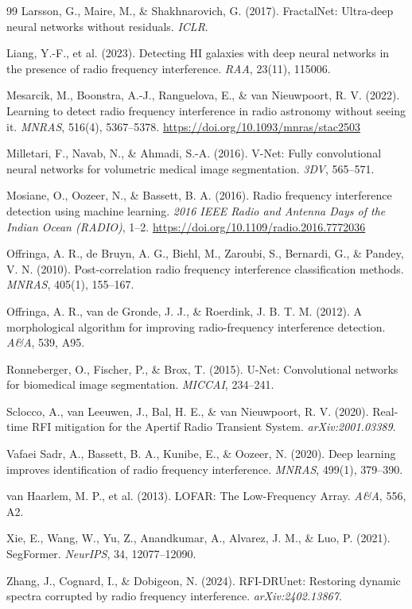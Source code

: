 \documentclass[11pt]{article}
\begin{document}
\begin{thebibliography}{99}
 Larsson, G., Maire, M., \& Shakhnarovich, G. (2017). FractalNet: Ultra-deep neural networks without residuals. \emph{ICLR}.

 Liang, Y.-F., et al. (2023). Detecting HI galaxies with deep neural networks in the presence of radio frequency interference. \emph{RAA}, 23(11), 115006.

 Mesarcik, M., Boonstra, A.-J., Ranguelova, E., \& van Nieuwpoort, R. V. (2022). Learning to detect radio frequency interference in radio astronomy without seeing it. \emph{MNRAS}, 516(4), 5367--5378. \url{https://doi.org/10.1093/mnras/stac2503}

 Milletari, F., Navab, N., \& Ahmadi, S.-A. (2016). V-Net: Fully convolutional neural networks for volumetric medical image segmentation. \emph{3DV}, 565--571.

 Mosiane, O., Oozeer, N., \& Bassett, B. A. (2016). Radio frequency interference detection using machine learning. \emph{2016 IEEE Radio and Antenna Days of the Indian Ocean (RADIO)}, 1--2. \url{https://doi.org/10.1109/radio.2016.7772036}

 Offringa, A. R., de Bruyn, A. G., Biehl, M., Zaroubi, S., Bernardi, G., \& Pandey, V. N. (2010). Post-correlation radio frequency interference classification methods. \emph{MNRAS}, 405(1), 155--167.

 Offringa, A. R., van de Gronde, J. J., \& Roerdink, J. B. T. M. (2012). A morphological algorithm for improving radio-frequency interference detection. \emph{A\&A}, 539, A95.

 Ronneberger, O., Fischer, P., \& Brox, T. (2015). U-Net: Convolutional networks for biomedical image segmentation. \emph{MICCAI}, 234--241.

 Sclocco, A., van Leeuwen, J., Bal, H. E., \& van Nieuwpoort, R. V. (2020). Real-time RFI mitigation for the Apertif Radio Transient System. \emph{arXiv:2001.03389}.

 Vafaei Sadr, A., Bassett, B. A., Kunibe, E., \& Oozeer, N. (2020). Deep learning improves identification of radio frequency interference. \emph{MNRAS}, 499(1), 379--390.

 van Haarlem, M. P., et al. (2013). LOFAR: The Low-Frequency Array. \emph{A\&A}, 556, A2.

 Xie, E., Wang, W., Yu, Z., Anandkumar, A., Alvarez, J. M., \& Luo, P. (2021). SegFormer. \emph{NeurIPS}, 34, 12077--12090.

 Zhang, J., Cognard, I., \& Dobigeon, N. (2024). RFI-DRUnet: Restoring dynamic spectra corrupted by radio frequency interference. \emph{arXiv:2402.13867}.

\end{thebibliography}
\end{document}
